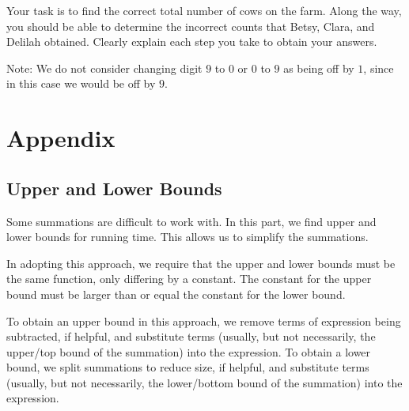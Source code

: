 \documentclass{article}
\begin{document}
    \hspace{15pt} Your task is to find the correct total number of cows on the farm. Along the way, you should be able to determine the incorrect counts that Betsy, Clara, and Delilah obtained. Clearly explain each step you take to obtain your answers.
    
    \vspace{1.5mm} {\small Note: We do not consider changing digit $9$ to $0$ or $0$ to $9$ as being off by $1$, since in this case we would be off by $9$. }

\section*{Appendix}

\subsection*{Upper and Lower Bounds}
    \qquad Some summations are difficult to work with. In this part, we find upper and lower bounds for running time. This allows us to simplify the summations.
    
    \qquad In adopting this approach, we require that the upper and lower bounds must be the same function, only differing by a constant. The constant for the upper bound must be larger than or equal the constant for the lower bound. 
    
    \qquad To obtain an upper bound in this approach, we remove terms of expression being subtracted, if helpful, and substitute terms (usually, but not necessarily, the upper/top bound of the summation) into the expression. To obtain a lower bound, we split summations to reduce size, if helpful, and substitute terms (usually, but not necessarily, the lower/bottom bound of the summation) into the expression.
\end{document}
